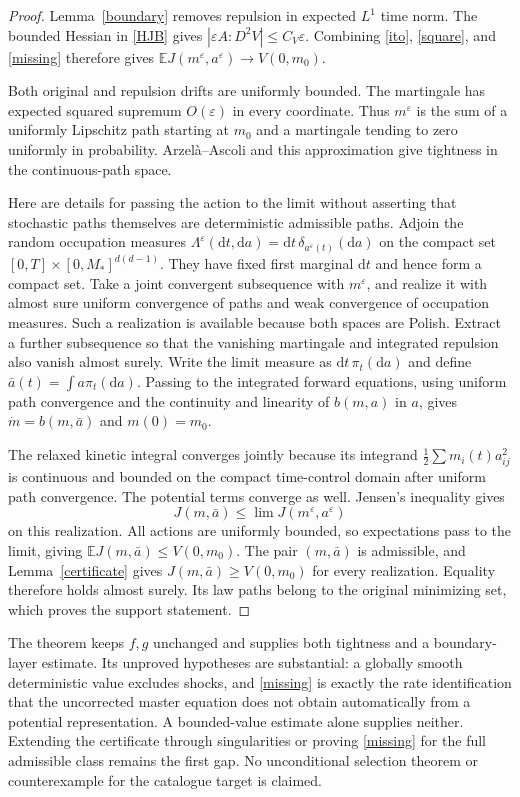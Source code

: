 \documentclass[11pt]{article}
\newcommand{\E}{\mathbb E}
\newcommand{\dd}{\mathrm d}
\begin{document}
\begin{proof}
Lemma~\ref{boundary} removes repulsion in expected $L^1$ time norm. The bounded Hessian in \eqref{HJB} gives $|\varepsilon A:D^2V|\le C_V\varepsilon$. Combining \eqref{ito}, \eqref{square}, and \eqref{missing} therefore gives
$\E J(m^\varepsilon,a^\varepsilon)\to V(0,m_0)$.

Both original and repulsion drifts are uniformly bounded. The martingale has expected squared supremum $O(\varepsilon)$ in every coordinate. Thus $m^\varepsilon$ is the sum of a uniformly Lipschitz path starting at $m_0$ and a martingale tending to zero uniformly in probability. Arzel\`a--Ascoli and this approximation give tightness in the continuous-path space.

Here are details for passing the action to the limit without asserting that stochastic paths themselves are deterministic admissible paths. Adjoin the random occupation measures
$\Lambda^\varepsilon(\dd t,\dd a)=\dd t\,\delta_{a^\varepsilon(t)}(\dd a)$ on the compact set $[0,T]\times[0,M_*]^{d(d-1)}$. They have fixed first marginal $\dd t$ and hence form a compact set. Take a joint convergent subsequence with $m^\varepsilon$, and realize it with almost sure uniform convergence of paths and weak convergence of occupation measures. Such a realization is available because both spaces are Polish. Extract a further subsequence so that the vanishing martingale and integrated repulsion also vanish almost surely. Write the limit measure as $\dd t\,\pi_t(\dd a)$ and define $\bar a(t)=\int a\pi_t(\dd a)$. Passing to the integrated forward equations, using uniform path convergence and the continuity and linearity of $b(m,a)$ in $a$, gives $\dot m=b(m,\bar a)$ and $m(0)=m_0$.

The relaxed kinetic integral converges jointly because its integrand $\frac12\sum m_i(t)a_{ij}^2$ is continuous and bounded on the compact time-control domain after uniform path convergence. The potential terms converge as well. Jensen's inequality gives
\[
 J(m,\bar a)\le\lim J(m^\varepsilon,a^\varepsilon)
\]
on this realization. All actions are uniformly bounded, so expectations pass to the limit, giving $\E J(m,\bar a)\le V(0,m_0)$. The pair $(m,\bar a)$ is admissible, and Lemma~\ref{certificate} gives $J(m,\bar a)\ge V(0,m_0)$ for every realization. Equality therefore holds almost surely. Its law paths belong to the original minimizing set, which proves the support statement.
\end{proof}

The theorem keeps $f,g$ unchanged and supplies both tightness and a boundary-layer estimate. Its unproved hypotheses are substantial: a globally smooth deterministic value excludes shocks, and \eqref{missing} is exactly the rate identification that the uncorrected master equation does not obtain automatically from a potential representation. A bounded-value estimate alone supplies neither. Extending the certificate through singularities or proving \eqref{missing} for the full admissible class remains the first gap. No unconditional selection theorem or counterexample for the catalogue target is claimed.
\end{document}
